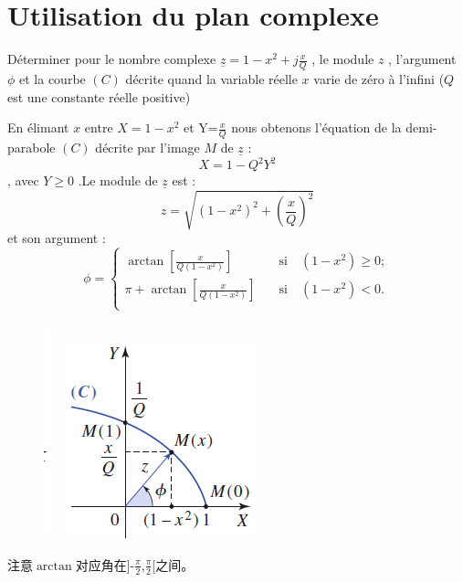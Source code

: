 \documentclass[12pt]{book}
\theoremstyle{definition}\newtheorem{dfn}{Définition}[chapter]
\theoremstyle{plain}\newtheorem{thm}{Théorème}[chapter]
\theoremstyle{plain}\newtheorem{prp}{Proposition}[chapter]
\theoremstyle{plain}\newtheorem{lem}{\bf Lemme}[chapter]
\theoremstyle{plain}\newtheorem{axm}{\bf Axiome}[chapter]
\theoremstyle{plain}\newtheorem{lmm}{\bf Lemme}[chapter]
\theoremstyle{plain}\newtheorem{cor}{\bf Corollaire}[chapter]
\theoremstyle{remark}\newtheorem{rem}{Remarque}[chapter]
\begin{document}
\section{Utilisation du plan complexe}

Déterminer pour le nombre complexe $\underline{z}=1-x^2+j\frac{x}{Q}$
, le module $z$ , l'argument $\phi$ et la courbe
$(C)$ décrite quand la variable réelle $x$ varie de zéro
à l'infini ($Q$ est une constante réelle positive)

En élimant $x$ entre $X=1-x^2$ et Y=$\frac{x}{Q}$ nous
obtenons l’équation de la demi-parabole $(C)$ décrite
par l'image $M$ de $\underline{z}$ :
$$
X=1-Q^2Y^2
$$ , avec $Y\ge 0$
.Le module de $\underline{z}$ est :
$$
z=\sqrt{(1-x^2)^2+(\frac{x}{Q})^2}
$$
et son argument :
$$
\phi=\left\{
\begin{aligned}
\arctan{[\frac{x}{Q(1-x^2)}]}&\quad \text{si} \quad(1-x^2)\ge 0;\\
\pi+\arctan{[\frac{x}{Q(1-x^2)}]}&\quad \text{si} \quad (1-x^2) < 0.\\
\end{aligned}
\right.
$$

\begin{figure}[H]
	\centering
	\includegraphics[scale=1]{image//Regime sinusoidal force//1}
\end{figure}
注意$\arctan$对应角在]-$\frac{\pi}{2}$,$\frac{\pi}{2}$[之间。
\end{document}

